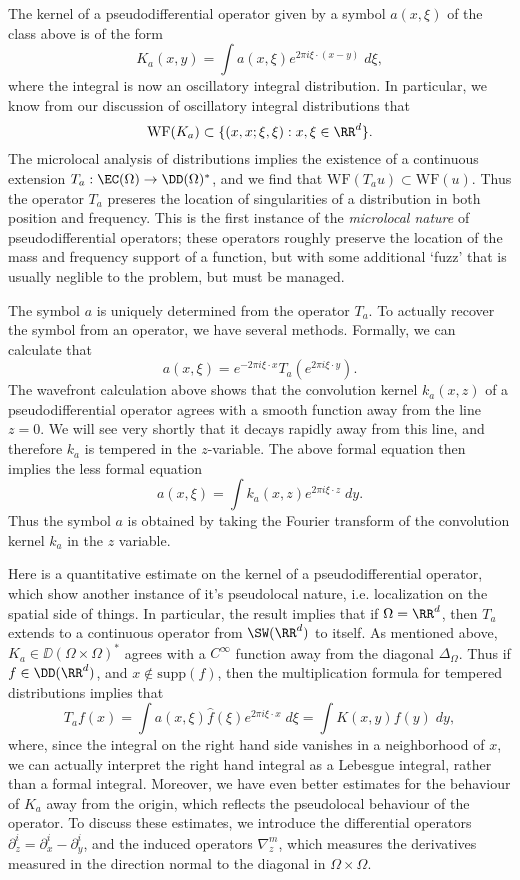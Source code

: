 The kernel of a pseudodifferential operator given by a symbol $a(x,\xi)$ of the class above is of the form
%
\[ K_a(x,y) = \int a(x,\xi) e^{2 \pi i \xi \cdot (x - y)}\; d\xi, \]
%
where the integral is now an oscillatory integral distribution. In particular, we know from our discussion of oscillatory integral distributions that
%
\[ \text{WF}(K_a) \subset \{ (x,x;\xi,\xi) : x, \xi \in \RR^d \}. \]
%
The microlocal analysis of distributions implies the existence of a continuous extension $T_a: \EC(\Omega) \to \DD(\Omega)^*$, and we find that $\text{WF}(T_au) \subset \text{WF}(u)$. Thus the operator $T_a$ preseres the location of singularities of a distribution in both position and frequency. This is the first instance of the \emph{microlocal nature} of pseudodifferential operators; these operators roughly preserve the location of the mass and frequency support of a function, but with some additional `fuzz' that is usually neglible to the problem, but must be managed.

The symbol $a$ is uniquely determined from the operator $T_a$. To actually recover the symbol from an operator, we have several methods. Formally, we can calculate that
%
\[ a(x,\xi) = e^{-2 \pi i \xi \cdot x} T_a(e^{2 \pi i \xi \cdot y}). \]
%
The wavefront calculation above shows that the convolution kernel $k_a(x,z)$ of a pseudodifferential operator agrees with a smooth function away from the line $z = 0$. We will see very shortly that it decays rapidly away from this line, and therefore $k_a$ is tempered in the $z$-variable. The above formal equation then implies the less formal equation
%
\[ a(x,\xi) = \int k_a(x,z) e^{2 \pi i \xi \cdot z}\; dy. \]
%
Thus the symbol $a$ is obtained by taking the Fourier transform of the convolution kernel $k_a$ in the $z$ variable.

Here is a quantitative estimate on the kernel of a pseudodifferential operator, which show another instance of it's pseudolocal nature, i.e. localization on the spatial side of things. In particular, the result implies that if $\Omega = \RR^d$, then $T_a$ extends to a continuous operator from $\SW(\RR^d)$ to itself. As mentioned above, $K_a \in \DD(\Omega \times \Omega)^*$ agrees with a $C^\infty$ function away from the diagonal $\Delta_\Omega$. Thus if $f \in \DD(\RR^d)$, and $x \not \in \text{supp}(f)$, then the multiplication formula for tempered distributions implies that
%
\[ T_af(x) = \int a(x,\xi) \widehat{f}(\xi) e^{2 \pi i \xi \cdot x}\; d\xi = \int K(x,y) f(y)\; dy, \]
%
where, since the integral on the right hand side vanishes in a neighborhood of $x$, we can actually interpret the right hand integral as a Lebesgue integral, rather than a formal integral. Moreover, we have even better estimates for the behaviour of $K_a$ away from the origin, which reflects the pseudolocal behaviour of the operator. To discuss these estimates, we introduce the differential operators $\partial^i_z = \partial^i_x - \partial^i_y$, and the induced operators $\nabla^m_z$, which measures the derivatives measured in the direction normal to the diagonal in $\Omega \times \Omega$.

